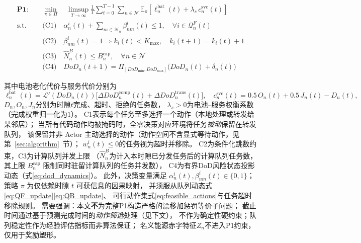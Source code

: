 \documentclass[a4paper,11pt]{article}
\begin{document}
\begin{equation}
\begin{aligned}
\mathbf{P1:} \quad &\min_{\pi \in \Pi} \quad
\limsup_{T \to \infty} \frac{1}{T} \sum_{t=0}^{T-1}
\sum_{n \in \mathcal{N}} \mathbb{E}_\pi\!\left[
\ell^{\mathrm{bat}}_n(t) + \lambda_s\, c^{\mathrm{svc}}_n(t)
\right] \\
\text{s.t.} \quad
&\text{(C1)} \quad \alpha^i_n(t) + \sum_{m \in \mathcal{N}_n}
\beta^i_{nm}(t) \leq 1,
\quad \forall i \in \mathcal{Q}^F_n(t) \\
&\text{(C2)} \quad \beta^i_{nm}(t)=1 \Rightarrow k_i(t) < K_{\max},
\quad k_i(t\!+\!1)=k_i(t)+1 \\
&\text{(C3)} \quad \hat{N}^B_n(t) \leq B^{\mathrm{cap}}_n,
\quad \forall n \in \mathcal{N} \\
&\text{(C4)} \quad DoD_n(t\!+\!1) =
\Pi_{[DoD_{\min},DoD_{\max}]}\!\big(DoD_n(t)+\delta_n(t)\big)
\end{aligned}
\label{eq:P1}
\end{equation}

其中电池老化代价与服务代价分别为
\begin{equation}
\ell^{\mathrm{bat}}_n(t) = \mathcal{L}'(DoD_n(t))\big[
\Delta DoD^{\mathrm{comp}}_n(t)+\Delta DoD^{\mathrm{trans}}_n(t)\big],
\quad
c^{\mathrm{svc}}_n(t) = 0.5\,O_n(t)+0.5\,J_n(t)-D_n(t),
\label{eq:p1_terms}
\end{equation}
$D_n,O_n,J_n$分别为时隙$t$完成、超时、拒绝的任务数，
$\lambda_s>0$为电池--服务权衡系数（完成权重归一化为$1$）。
C1表示每个任务至多选择一个动作（本地处理或转发给某邻居）；
当所有代码动作均被掩码时，全零决策对应环境将任务\emph{被动}保留在转发队列，
该保留并非 Actor 主动选择的动作（动作空间不含显式等待动作，见第~\ref{sec:algorithm}~节）；
$w^i_n(t)\le 0$的任务视为超时并移除。
C2为条件化跳数约束，C3为计算队列并发上限
（$\hat{N}^B_n$为计入本时隙已分发任务后的计算队列任务数，
其上限 $B^{\mathrm{cap}}_n$ 限制同时驻留计算队列的任务并发数），
C4为有界DoD风险状态投影动态（式\eqref{eq:dod_dynamics}）。
此外，决策变量满足 $\alpha^i_n(t),\beta^i_{nm}(t)\in\{0,1\}$；
策略 $\pi$ 为仅依赖时隙 $t$ 可获信息的因果映射，
并须服从队列动态式\eqref{eq:QF_update}\eqref{eq:QB_update}、
可行动作集式\eqref{eq:feasible_actions}与任务超时移除规则。
需要强调：本文\textbf{不}为完整P1构造严格的漂移加惩罚等价子问题；
截止时间通过基于预测完成时间的\emph{动作筛选}处理（见下文），
不作为确定性硬约束；队列稳定性作为经验评估指标而非算法保证；
名义能源赤字特征$Z_n$不进入P1约束，仅用于奖励塑形。

\end{document}
